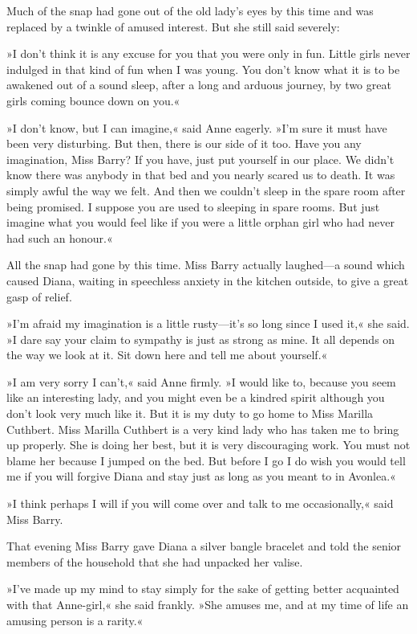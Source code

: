 Much of the snap had gone out of the old lady’s eyes by this time and was replaced by a twinkle of amused interest. But she still said severely:

»I don’t think it is any excuse for you that you were only in fun. Little girls never indulged in that kind of fun when I was young. You don’t know what it is to be awakened out of a sound sleep, after a long and arduous journey, by two great girls coming bounce down on you.«

»I don’t know, but I can imagine,« said Anne eagerly. »I’m sure it must have been very disturbing. But then, there is our side of it too. Have you any imagination, Miss Barry? If you have, just put yourself in our place. We didn’t know there was anybody in that bed and you nearly scared us to death. It was simply awful the way we felt. And then we couldn’t sleep in the spare room after being promised. I suppose you are used to sleeping in spare rooms. But just imagine what you would feel like if you were a little orphan girl who had never had such an honour.«

All the snap had gone by this time. Miss Barry actually laughed—a sound which caused Diana, waiting in speechless anxiety in the kitchen outside, to give a great gasp of relief.

»I’m afraid my imagination is a little rusty—it’s so long since I used it,« she said. »I dare say your claim to sympathy is just as strong as mine. It all depends on the way we look at it. Sit down here and tell me about yourself.«

»I am very sorry I can’t,« said Anne firmly. »I would like to, because you seem like an interesting lady, and you might even be a kindred spirit although you don’t look very much like it. But it is my duty to go home to Miss Marilla Cuthbert. Miss Marilla Cuthbert is a very kind lady who has taken me to bring up properly. She is doing her best, but it is very discouraging work. You must not blame her because I jumped on the bed. But before I go I do wish you would tell me if you will forgive Diana and stay just as long as you meant to in Avonlea.«

»I think perhaps I will if you will come over and talk to me occasionally,« said Miss Barry.

That evening Miss Barry gave Diana a silver bangle bracelet and told the senior members of the household that she had unpacked her valise.

»I’ve made up my mind to stay simply for the sake of getting better acquainted with that Anne-girl,« she said frankly. »She amuses me, and at my time of life an amusing person is a rarity.«

